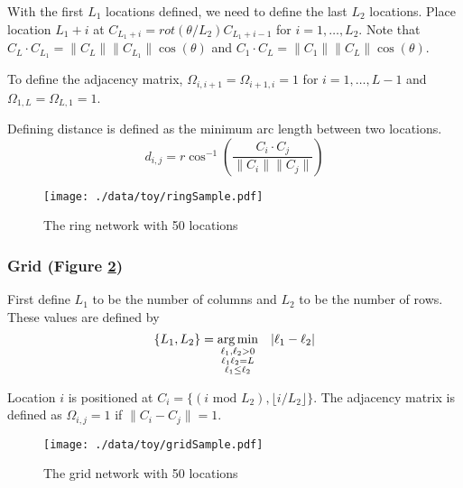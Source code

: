 \documentclass[11pt]{article}
\begin{document}
With the first $L_1$ locations defined, we need to define the last
$L_2$ locations.  Place location $L_1 + i$ at $C_{L_1 + i} =
    rot(\theta/L_2)C_{L_1 + i - 1}$ for $i = 1,\ldots,L_2$.  Note that
$C_{L} \cdot C_{L_1} = \|C_{L}\| \|C_{L_1}\| \cos(\theta)$ and $C_{1}
    \cdot C_{L} = \|C_{1}\| \|C_{L}\| \cos(\theta)$.

To define the adjacency matrix, $\Omega_{i,i+1} = \Omega_{i+1,i} = 1$ for $i =
    1,\ldots,L-1$ and $\Omega_{1,L} = \Omega_{L,1} = 1$.

Defining distance is defined as the minimum arc length between two
locations.
\begin{equation*}
  d_{i,j} = r\cos^{-1}\left(\frac{C_{i} \cdot
      C_{j}}{\|C_{i}\|\|C_{j}\|}\right)
\end{equation*}





\begin{figure}[htb]
\centering
\texttt{[image: ./data/toy/ringSample.pdf]}
\caption{\label{fig:ring50}The ring network with 50 locations}
\end{figure}




\subsubsection{Grid (Figure \ref{fig:grid50})}
\label{sec-3-1-4}

First define $L_1$ to be the number of columns and $L_2$ to be the
number of rows.  These values are defined by
\begin{equation*}
  \lbrace L_1, L_2 \rbrace = \underset{
    \begin{subarray}{c}
      \ell_1,\ell_2 > 0\\
      \ell_1\ell_2 = L\\
      \ell_1 \le \ell_2
    \end{subarray}
  }{\arg\min} \quad |\ell_1 - \ell_2|
\end{equation*}

Location $i$ is positioned at $C_i = \lbrace (i \text{ mod } L_2), \lfloor
    i/L_2 \rfloor \rbrace$.  The adjacency matrix is defined as $\Omega_{i,j} =
    1$ if $\|C_i - C_j\| = 1$.

\begin{figure}[htb]
\centering
\texttt{[image: ./data/toy/gridSample.pdf]}
\caption{\label{fig:grid50}The grid network with 50 locations}
\end{figure}
\end{document}

